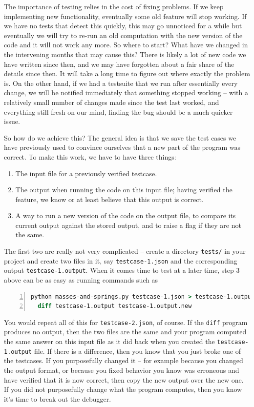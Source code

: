 \documentclass{article}
\begin{document}
The importance of testing relies in the cost of fixing problems. If we keep
implementing new functionality, eventually some old feature will stop
working. If we have no tests that detect this quickly, this may go unnoticed
for a while but eventually we will try to re-run an old computation with the
new version of the code and it will not work any more. So where to start? What
have we changed in the intervening months that may cause this? There is likely
a lot of new code we have written since then, and we may have forgotten about
a fair share of the details since then. It will take a long time to figure out
where exactly the problem is. On the other hand, if we had a testsuite that we
run after essentially every change, we will be notified immediately that something stopped
working -- with a relatively small number of changes made since
the test last worked, and everything still fresh on our mind, finding the bug
should be a much quicker issue.

So how do we achieve this? The general idea is that we save the test cases we
have previously used to convince ourselves that a new part of the program was
correct. To make this work, we have to have three things:
\begin{enumerate}
\item The input file for a previously verified testcase.
\item The output when running the code on this input file; having verified the
  feature, we know or at least believe that this output is correct.
\item A way to run a new version of the code on the output file, to compare
  its current output against the stored output, and to raise a flag if they
  are not the same.
\end{enumerate}
The first two are really not very complicated -- create a directory
\texttt{tests/} in your project and create two files in it, say
\texttt{testcase-1.json} and the corresponding output
\texttt{testcase-1.output}. When it comes time to test at a later time, step 3
above can be as easy as running commands such as
\begin{lstlisting}[frame=single,basicstyle=\footnotesize,numbers=left,language=csh]
  python masses-and-springs.py testcase-1.json > testcase-1.output.new
  diff testcase-1.output testcase-1.output.new
\end{lstlisting}
You would repeat all of this for \texttt{testcase-2.json}, of course.
If the \texttt{diff} program produces no output, then the two files are the
same and your program computed the same answer on this input file as it did
back when you created the \texttt{testcase-1.output} file. If there is a
difference, then you know that you just broke one of the testcases. If you
purposefully changed it -- for example because you changed the output format,
or because you fixed behavior you know was erroneous and have verified that it
is now correct, then copy the new output over the new one. If you did not
purposefully change what the program computes, then you know it's time to break out the debugger.
\end{document}
